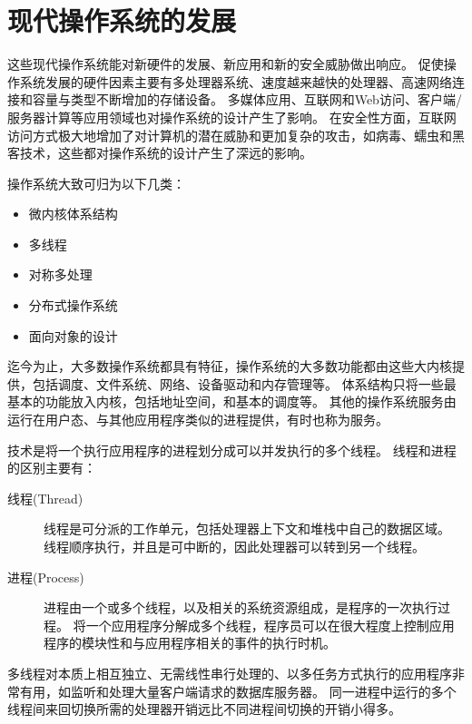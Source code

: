 
\section{现代操作系统的发展}
{
    这些现代操作系统能对新硬件的发展、新应用和新的安全威胁做出响应。
    促使操作系统发展的硬件因素主要有多处理器系统、速度越来越快的处理器、高速网络连接和容量与类型不断增加的存储设备。
    多媒体应用、互联网和Web访问、客户端/服务器计算等应用领域也对操作系统的设计产生了影响。
    在安全性方面，互联网访问方式极大地增加了对计算机的潜在威胁和更加复杂的攻击，如病毒、蠕虫和黑客技术，这些都对操作系统的设计产生了深远的影响。

    操作系统大致可归为以下几类：

    \begin{itemize}
        \item 微内核体系结构
        \item 多线程
        \item 对称多处理
        \item 分布式操作系统
        \item 面向对象的设计
    \end{itemize}

    迄今为止，大多数操作系统都具有特征，操作系统的大多数功能都由这些大内核提供，包括调度、文件系统、网络、设备驱动和内存管理等。
    体系结构只将一些最基本的功能放入内核，包括地址空间，和基本的调度等。
    其他的操作系统服务由运行在用户态、与其他应用程序类似的进程提供，有时也称为服务。

    技术是将一个执行应用程序的进程划分成可以并发执行的多个线程。
    线程和进程的区别主要有：

    \begin{description}
        \item[线程(Thread)]
        {
            线程是可分派的工作单元，包括处理器上下文和堆栈中自己的数据区域。
            线程顺序执行，并且是可中断的，因此处理器可以转到另一个线程。
        }
        \item[进程(Process)]
        {
            进程由一个或多个线程，以及相关的系统资源组成，是程序的一次执行过程。
            将一个应用程序分解成多个线程，程序员可以在很大程度上控制应用程序的模块性和与应用程序相关的事件的执行时机。
        }
    \end{description}

    多线程对本质上相互独立、无需线性串行处理的、以多任务方式执行的应用程序非常有用，如监听和处理大量客户端请求的数据库服务器。
    同一进程中运行的多个线程间来回切换所需的处理器开销远比不同进程间切换的开销小得多。

}
